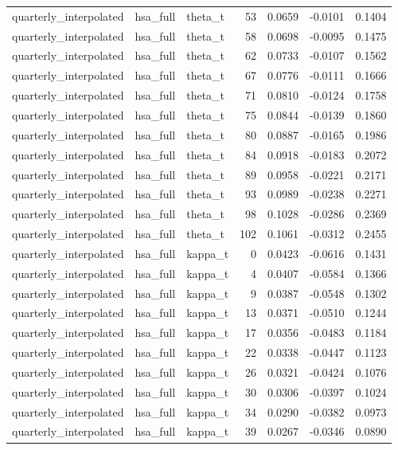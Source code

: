 \begin{tabular}{lllrrrr}
quarterly\_interpolated & hsa\_full & theta\_t & 53 & 0.0659 & -0.0101 & 0.1404 \\
quarterly\_interpolated & hsa\_full & theta\_t & 58 & 0.0698 & -0.0095 & 0.1475 \\
quarterly\_interpolated & hsa\_full & theta\_t & 62 & 0.0733 & -0.0107 & 0.1562 \\
quarterly\_interpolated & hsa\_full & theta\_t & 67 & 0.0776 & -0.0111 & 0.1666 \\
quarterly\_interpolated & hsa\_full & theta\_t & 71 & 0.0810 & -0.0124 & 0.1758 \\
quarterly\_interpolated & hsa\_full & theta\_t & 75 & 0.0844 & -0.0139 & 0.1860 \\
quarterly\_interpolated & hsa\_full & theta\_t & 80 & 0.0887 & -0.0165 & 0.1986 \\
quarterly\_interpolated & hsa\_full & theta\_t & 84 & 0.0918 & -0.0183 & 0.2072 \\
quarterly\_interpolated & hsa\_full & theta\_t & 89 & 0.0958 & -0.0221 & 0.2171 \\
quarterly\_interpolated & hsa\_full & theta\_t & 93 & 0.0989 & -0.0238 & 0.2271 \\
quarterly\_interpolated & hsa\_full & theta\_t & 98 & 0.1028 & -0.0286 & 0.2369 \\
quarterly\_interpolated & hsa\_full & theta\_t & 102 & 0.1061 & -0.0312 & 0.2455 \\
quarterly\_interpolated & hsa\_full & kappa\_t & 0 & 0.0423 & -0.0616 & 0.1431 \\
quarterly\_interpolated & hsa\_full & kappa\_t & 4 & 0.0407 & -0.0584 & 0.1366 \\
quarterly\_interpolated & hsa\_full & kappa\_t & 9 & 0.0387 & -0.0548 & 0.1302 \\
quarterly\_interpolated & hsa\_full & kappa\_t & 13 & 0.0371 & -0.0510 & 0.1244 \\
quarterly\_interpolated & hsa\_full & kappa\_t & 17 & 0.0356 & -0.0483 & 0.1184 \\
quarterly\_interpolated & hsa\_full & kappa\_t & 22 & 0.0338 & -0.0447 & 0.1123 \\
quarterly\_interpolated & hsa\_full & kappa\_t & 26 & 0.0321 & -0.0424 & 0.1076 \\
quarterly\_interpolated & hsa\_full & kappa\_t & 30 & 0.0306 & -0.0397 & 0.1024 \\
quarterly\_interpolated & hsa\_full & kappa\_t & 34 & 0.0290 & -0.0382 & 0.0973 \\
quarterly\_interpolated & hsa\_full & kappa\_t & 39 & 0.0267 & -0.0346 & 0.0890 \\

\end{tabular}
